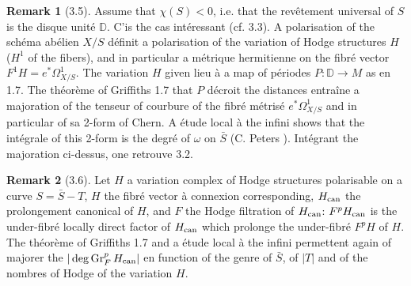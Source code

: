 \documentclass[12pt,a4paper]{article}
\theoremstyle{plain}
\theoremstyle{definition}
\newtheorem{remark}{Remark}[section]
\DeclareMathOperator{\Gr}{Gr}
\newcommand{\can}{\textup{can}}
\begin{document}
{\begin{remark}[3.5]
Assume that $\chi(S) < 0$, i.e. that the rev\^{e}tement universal of $S$ is the disque unit\'{e} $\mathbb{D}$. C'is the cas int\'{e}ressant (cf. 3.3). A polarisation of the sch\'{e}ma ab\'{e}lien $X/S$ d\'{e}finit a polarisation of the variation of Hodge structures $H$ ($H^{1}$ of the fibers), and in particular a m\'{e}trique hermitienne on the fibr\'{e} vector $F^{1}H = e^{*}\Omega^{1}_{X/S}$. The variation $H$ given lieu \`{a} a map of p\'{e}riodes $P : \mathbb{D} \to M$ as en 1.7. The th\'{e}or\`{e}me of Griffiths 1.7 that $P$ d\'{e}croit the distances entra\^{i}ne a majoration of the tenseur of courbure of the fibr\'{e} m\'{e}tris\'{e} $e^{*}\Omega^{1}_{X/S}$ and in particular of sa 2-form of Chern. A \'{e}tude local \`{a} the infini shows that the int\'{e}grale of this 2-form is the degr\'{e} of $\omega$ on $\bar{S}$ (C. Peters \cite{Peters}). Int\'{e}grant the majoration ci-dessus, one retrouve 3.2.
\end{remark}

\begin{remark}[3.6]
Let $H$ a variation complex of Hodge structures polarisable on a curve $S = \bar{S} - T$, $H$ the fibr\'{e} vector \`{a} connexion corresponding, $H_{\can}$ the prolongement canonical of $H$, and $F$ the Hodge filtration of $H_{\can}$: $F^{p}H_{\can}$ is the under-fibr\'{e} locally direct factor of $H_{\can}$ which prolonge the under-fibr\'{e} $F^{p}H$ of $H$. The th\'{e}or\`{e}me of Griffiths 1.7 and a \'{e}tude local \`{a} the infini \cite{Zucker} permettent again of majorer the $|\deg \Gr_{F}^{p}H_{\can}|$ en function of the genre of $\bar{S}$, of $|T|$ and of the nombres of Hodge of the variation $H$.
\end{remark}

}
\end{document}
